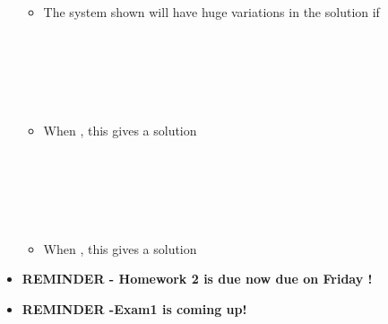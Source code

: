 \documentclass[11pt]{article}
\begin{document}
\begin{itemize}
\begin{itemize}
		 \\\\
		\\\\
	
	\item The system shown will have huge variations in the solution if \\\\
	
		 \\\\
		\\\\
	\item When , this gives a solution 	\\\\
	
	 \\\\
		\\\\
	\item When , this gives a solution 	

\end{itemize}
\newpage 

	 \item \textbf{ \LARGE REMINDER - Homework 2 is due now due on Friday !} \\
 \item \textbf{ \LARGE REMINDER -Exam1 is coming up!} \\
\end{itemize}


	
\end{document}
